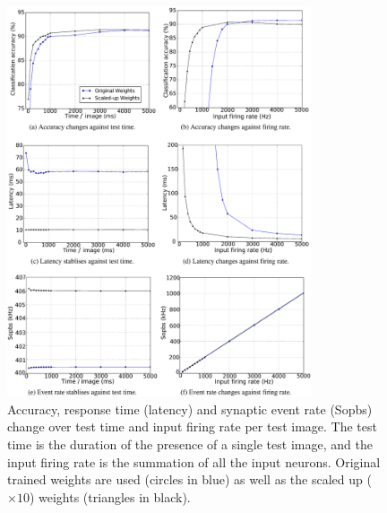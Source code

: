 \documentclass{frontiersENG} %
\begin{document}
\begin{figure}[htb!]
	\centering
	\includegraphics[width=0.8\textwidth]{fig7_m}
	\caption{Accuracy, response time (latency) and synaptic event rate (Sopbs) change over test time and input firing rate per test image.
	The test time is the duration of the presence of a single test image, and the input firing rate is the summation of all the input neurons.
	Original trained weights are used (circles in blue) as well as the scaled up ($\times10$) weights (triangles in black). }
	\label{fig:assess}
\end{figure}
\end{document}
